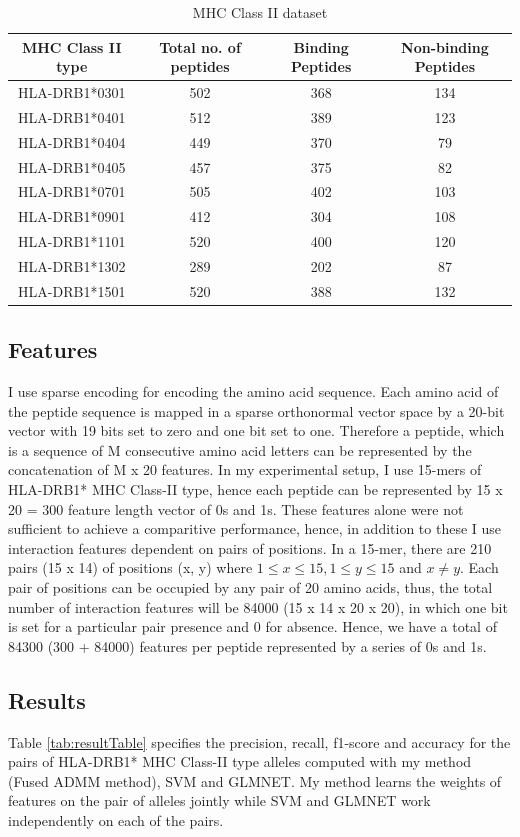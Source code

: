 \documentclass[conference,10pt,draftclsnofoot,onecolumn]{IEEEtran}
\begin{document}
\begin{table}[!t]
\caption{MHC Class II dataset}
\label{tab:dataset}
\centering
\begin{tabular}{|c||c||c||c|}
\hline
MHC Class II type & Total no. of peptides & Binding Peptides & Non-binding Peptides\\
\hline
HLA-DRB1*0301 & 502 & 368 & 134\\
\hline
HLA-DRB1*0401 & 512 & 389 & 123\\
\hline
HLA-DRB1*0404 & 449 & 370 & 79\\
\hline
HLA-DRB1*0405 & 457 & 375 & 82\\
\hline
HLA-DRB1*0701 & 505 & 402 & 103\\
\hline
HLA-DRB1*0901 & 412 & 304 & 108\\
\hline
HLA-DRB1*1101 & 520 & 400 & 120\\
\hline
HLA-DRB1*1302 & 289 & 202 & 87\\
\hline
HLA-DRB1*1501 & 520 & 388 & 132\\
\hline
\end{tabular}
\end{table}

\subsection{Features}
\label{subsec:features}
I use sparse encoding \cite{qian88} for encoding the amino acid sequence. Each amino acid of the peptide sequence is mapped in a sparse orthonormal vector space by a 20-bit vector with 19 bits set to zero and one bit set to one. Therefore a peptide, which is a sequence of M consecutive amino acid letters can be represented by the concatenation of M x 20 features. In my experimental setup, I use 15-mers of HLA-DRB1* MHC Class-II type, hence each peptide can be represented by 15 x 20 = 300 feature length vector of 0s and 1s. These features alone were not sufficient to achieve a comparitive performance, hence, in addition to these I use interaction features dependent on pairs of positions. In a 15-mer, there are 210 pairs (15 x 14) of positions (x, y) where $1 \le x \le 15, 1 \le y \le 15$ and $x \ne y$. Each pair of positions can be occupied by any pair of 20 amino acids, thus, the total number of interaction features will be 84000 (15 x 14 x 20 x 20), in which one bit is set for a particular pair presence and 0 for absence. Hence, we have a total of 84300 (300 + 84000) features per peptide represented by a series of 0s and 1s.

\subsection{Results}
\label{subsec:results}
Table \ref{tab:resultTable} specifies the precision, recall, f1-score and accuracy for the pairs of HLA-DRB1* MHC Class-II type alleles computed with my method (Fused ADMM method), SVM and GLMNET. My method learns the weights of features on the pair of alleles jointly while SVM and GLMNET work independently on each of the pairs.
\end{document}
